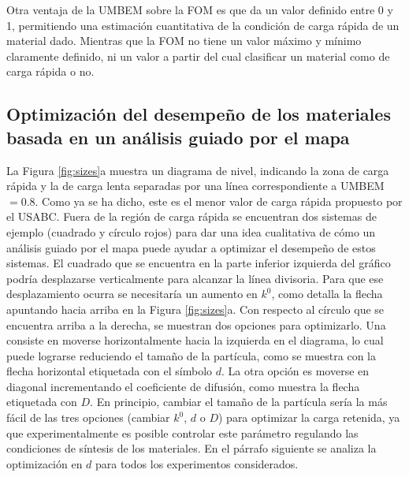 Otra ventaja de la UMBEM sobre la FOM es que da un valor definido entre 0 y 1,
permitiendo una estimación cuantitativa de la condición de carga rápida de un
material dado. Mientras que la FOM no tiene un valor máximo y mínimo claramente
definido, ni un valor a partir del cual clasificar un material como de carga 
rápida o no.

\subsection{Optimización del desempeño de los materiales basada en un análisis 
guiado por el mapa}

La Figura \ref{fig:sizes}a muestra un diagrama de nivel, indicando la zona de 
carga rápida y la de carga lenta separadas por una línea correspondiente a
UMBEM$ = 0.8$. Como ya se ha dicho, este es el menor valor de carga rápida 
propuesto por el USABC. Fuera de la región de carga rápida se encuentran dos 
sistemas de ejemplo (cuadrado y círculo rojos) para dar una idea cualitativa de 
cómo un análisis guiado por el mapa puede ayudar a optimizar el desempeño de 
estos sistemas. El cuadrado que se encuentra en la parte inferior izquierda del gráfico 
podría desplazarse verticalmente para alcanzar la línea divisoria. Para que 
ese desplazamiento ocurra se necesitaría un aumento en $k^0$, como detalla la 
flecha apuntando hacia arriba en la Figura \ref{fig:sizes}a. Con respecto al 
círculo que se encuentra arriba a la derecha, se muestran dos opciones para
optimizarlo. Una consiste en moverse horizontalmente hacia la izquierda en el 
diagrama, lo cual puede lograrse reduciendo el tamaño de la partícula, como 
se muestra con la flecha horizontal etiquetada con el símbolo $d$. La otra opción
es moverse en diagonal incrementando el coeficiente de difusión, como 
muestra la flecha etiquetada con $D$. En principio, cambiar el tamaño de la 
partícula sería la más fácil de las tres opciones (cambiar $k^0$, $d$ o $D$) para 
optimizar la carga retenida, ya que experimentalmente es posible controlar este 
parámetro regulando las condiciones de síntesis de los materiales. En el párrafo
siguiente se analiza la optimización en $d$ para todos los experimentos 
considerados.
